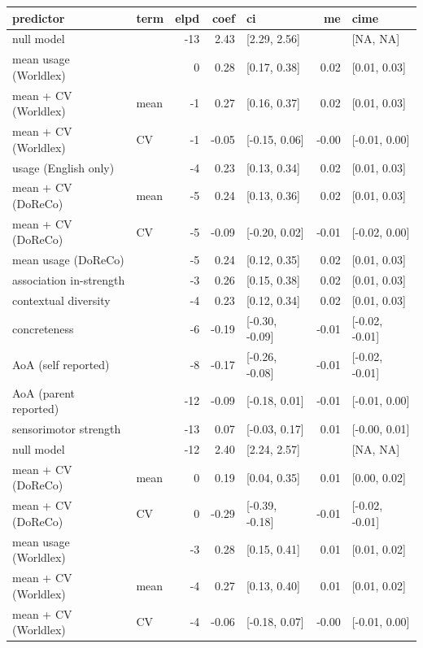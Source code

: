 \begin{table}[ht]
\centering
\begin{tabular}{llrrlrl}
  \hline
predictor & term & elpd & coef & ci & me & cime \\ 
  \hline
null model &  & -13 & 2.43 & [2.29, 2.56] &  & [NA, NA] \\ 
  mean usage (Worldlex) &  & 0 & 0.28 & [0.17, 0.38] & 0.02 & [0.01, 0.03] \\ 
  mean + CV (Worldlex) & mean & -1 & 0.27 & [0.16, 0.37] & 0.02 & [0.01, 0.03] \\ 
  mean + CV (Worldlex) & CV & -1 & -0.05 & [-0.15, 0.06] & -0.00 & [-0.01, 0.00] \\ 
  usage (English only) &  & -4 & 0.23 & [0.13, 0.34] & 0.02 & [0.01, 0.03] \\ 
  mean + CV (DoReCo) & mean & -5 & 0.24 & [0.13, 0.36] & 0.02 & [0.01, 0.03] \\ 
  mean + CV (DoReCo) & CV & -5 & -0.09 & [-0.20, 0.02] & -0.01 & [-0.02, 0.00] \\ 
  mean usage (DoReCo) &  & -5 & 0.24 & [0.12, 0.35] & 0.02 & [0.01, 0.03] \\ 
  association in-strength &  & -3 & 0.26 & [0.15, 0.38] & 0.02 & [0.01, 0.03] \\ 
  contextual diversity &  & -4 & 0.23 & [0.12, 0.34] & 0.02 & [0.01, 0.03] \\ 
  concreteness &  & -6 & -0.19 & [-0.30, -0.09] & -0.01 & [-0.02, -0.01] \\ 
  AoA (self reported) &  & -8 & -0.17 & [-0.26, -0.08] & -0.01 & [-0.02, -0.01] \\ 
  AoA (parent reported) &  & -12 & -0.09 & [-0.18, 0.01] & -0.01 & [-0.01, 0.00] \\ 
  sensorimotor strength &  & -13 & 0.07 & [-0.03, 0.17] & 0.01 & [-0.00, 0.01] \\ 
  null model &  & -12 & 2.40 & [2.24, 2.57] &  & [NA, NA] \\ 
  mean + CV (DoReCo) & mean & 0 & 0.19 & [0.04, 0.35] & 0.01 & [0.00, 0.02] \\ 
  mean + CV (DoReCo) & CV & 0 & -0.29 & [-0.39, -0.18] & -0.01 & [-0.02, -0.01] \\ 
  mean usage (Worldlex) &  & -3 & 0.28 & [0.15, 0.41] & 0.01 & [0.01, 0.02] \\ 
  mean + CV (Worldlex) & mean & -4 & 0.27 & [0.13, 0.40] & 0.01 & [0.01, 0.02] \\ 
  mean + CV (Worldlex) & CV & -4 & -0.06 & [-0.18, 0.07] & -0.00 & [-0.01, 0.00] \\ 

\end{tabular}
\end{table}
